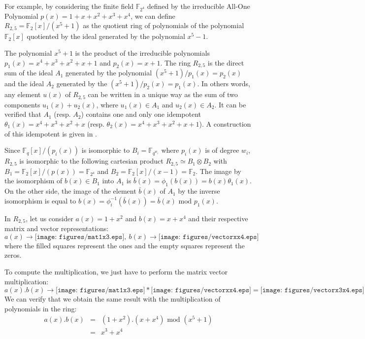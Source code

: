 \documentclass[conference]{IEEEtran}
\begin{document}
For example, by considering the finite field $\mathbb{F}_{2^4}$ defined by the irreducible All-One Polynomial $p(x) = 1 + x + x^2 + x^3 + x^4$, we can define $R_{2,5} = \mathbb{F}_{2}[x]/(x^5 + 1)$ as the quotient ring of polynomials of the polynomial $\mathbb{F}_2[x]$ quotiented by the ideal generated by the polynomial $x^5 -1$.

The polynomial $x^5+1$ is the product of the irreducible polynomials $p_1(x)=x^4 + x^3 + x^2 + x + 1$ and $p_2(x)=x+1$. The ring $R_{2,5}$ is the direct sum of the ideal $A_1$ generated by the polynomial $(x^5 + 1) /p_1(x) = p_2(x)$ and the ideal $A_2$ generated by the $(x^5 + 1) / p_2(x) = p_1(x)$. In others words, any element $u(x)$ of $R_{2,5}$ can be written in a unique way as the sum of two components $u_1(x)+u_2(x)$, where $u_1(x)\in A_1$ and $u_2(x)\in A_2$.
	It can be verified that $A_1$ (resp. $A_2$) contains one and only one idempotent $\theta_1(x)=x^4 + x^3 + x^2 + x$ (resp. $\theta_2(x)=x^4 + x^3 + x^2 + x+1$). A construction of this idempotent is given in \cite[Chap. 8, Theorem 6]{MWSl77}.

Since $\mathbb{F}_q[x]/(p_i(x))$ is isomorphic to $B_i = \mathbb{F}_{q^{w_i}}$ where $p_i(x)$ is of degree $w_i$, $R_{2,5}$ is isomorphic to the following cartesian product $R_{2,5} \simeq B_1 \otimes B_2$ with $B_1=\mathbb{F}_2[x]/(p(x))=\mathbb{F}_{2^4}$ and $B_2=\mathbb{F}_2[x]/(x-1)=\mathbb{F}_2$. The image by the isomorphism of  $b(x)\in B_1$ into $A_1$  is $\bar{b}(x)=\phi_1(b(x))= b(x)\theta_1(x) $. On the other side, the image of the element  $\bar{b}(x)$ of $A_1$ by the inverse isomorphism is equal to $b(x)=\phi_i^{-1}(\bar{b}(x))=\bar{b}(x)\textrm{ mod }p_1(x)$. 

	In $R_{2,5}$, let us consider $a(x)=1+x^2$ and $b(x)=x+x^4$ and their respective matrix and vector representations:
	\begin{displaymath}
	a(x) \longrightarrow \texttt{[image: figures/mat1x3.eps]}, \ b(x)  \longrightarrow    \texttt{[image: figures/vectorxx4.eps]}
	\end{displaymath}
	where the filled squares represent the ones and the empty squares represent the zeros.
	
	To compute the multiplication, we just have to perform the matrix vector multiplication:
	\begin{displaymath}
	a(x).b(x) \longrightarrow \texttt{[image: figures/mat1x3.eps]} * \texttt{[image: figures/vectorxx4.eps]} = \texttt{[image: figures/vectorx3x4.eps]} \longrightarrow  c(x)= x^3+x^4  
	\end{displaymath}
	We can verify that we obtain the same result with the multiplication of polynomials in the ring:
	\begin{eqnarray}
	a(x).b(x)& = & (1+x^2).(x+x^4)\textrm{ mod }(x^5+1) \nonumber\\
	& = & x^3+x^4 \nonumber
	\end{eqnarray}
\end{document}

